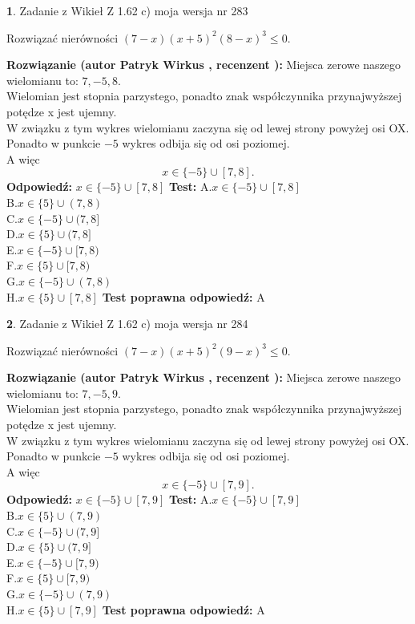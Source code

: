 \documentclass[12pt, a4paper]{article}
\theoremstyle{definition} %
\newtheorem{zad}{}
\newcommand{\zadStart}[1]{\begin{zad}#1\newline}
\newcommand{\zadStop}{\end{zad}}
\newcommand{\rozwStart}[2]{\noindent \textbf{Rozwiązanie (autor #1 , recenzent #2): }\newline}
\newcommand{\rozwStop}{\newline}
\newcommand{\odpStart}{\noindent \textbf{Odpowiedź:}\newline}
\newcommand{\odpStop}{\newline}
\newcommand{\testStart}{\noindent \textbf{Test:}\newline}
\newcommand{\testStop}{\newline}
\newcommand{\kluczStart}{\noindent \textbf{Test poprawna odpowiedź:}\newline}
\newcommand{\kluczStop}{\newline}
\begin{document}
\zadStart{Zadanie z Wikieł Z 1.62 c) moja wersja nr 283}

Rozwiązać nierówności $(7-x)(x+5)^{2}(8-x)^{3}\le0$.
\zadStop
\rozwStart{Patryk Wirkus}{}
Miejsca zerowe naszego wielomianu to: $7, -5, 8$.\\
Wielomian jest stopnia parzystego, ponadto znak współczynnika przy\linebreak najwyższej potędze x jest ujemny.\\ W związku z tym wykres wielomianu zaczyna się od lewej strony powyżej osi OX.\\
Ponadto w punkcie $-5$ wykres odbija się od osi poziomej.\\
A więc $$x \in \{-5\} \cup [7,8].$$
\rozwStop
\odpStart
$x \in \{-5\} \cup [7,8]$
\odpStop
\testStart
A.$x \in \{-5\} \cup [7,8]$\\
B.$x \in \{5\} \cup (7,8)$\\
C.$x \in \{-5\} \cup (7,8]$\\
D.$x \in \{5\} \cup (7,8]$\\
E.$x \in \{-5\} \cup [7,8)$\\
F.$x \in \{5\} \cup [7,8)$\\
G.$x \in \{-5\} \cup (7,8)$\\
H.$x \in \{5\} \cup [7,8]$
\testStop
\kluczStart
A
\kluczStop



\zadStart{Zadanie z Wikieł Z 1.62 c) moja wersja nr 284}

Rozwiązać nierówności $(7-x)(x+5)^{2}(9-x)^{3}\le0$.
\zadStop
\rozwStart{Patryk Wirkus}{}
Miejsca zerowe naszego wielomianu to: $7, -5, 9$.\\
Wielomian jest stopnia parzystego, ponadto znak współczynnika przy\linebreak najwyższej potędze x jest ujemny.\\ W związku z tym wykres wielomianu zaczyna się od lewej strony powyżej osi OX.\\
Ponadto w punkcie $-5$ wykres odbija się od osi poziomej.\\
A więc $$x \in \{-5\} \cup [7,9].$$
\rozwStop
\odpStart
$x \in \{-5\} \cup [7,9]$
\odpStop
\testStart
A.$x \in \{-5\} \cup [7,9]$\\
B.$x \in \{5\} \cup (7,9)$\\
C.$x \in \{-5\} \cup (7,9]$\\
D.$x \in \{5\} \cup (7,9]$\\
E.$x \in \{-5\} \cup [7,9)$\\
F.$x \in \{5\} \cup [7,9)$\\
G.$x \in \{-5\} \cup (7,9)$\\
H.$x \in \{5\} \cup [7,9]$
\testStop
\kluczStart
A
\kluczStop
\end{document}
